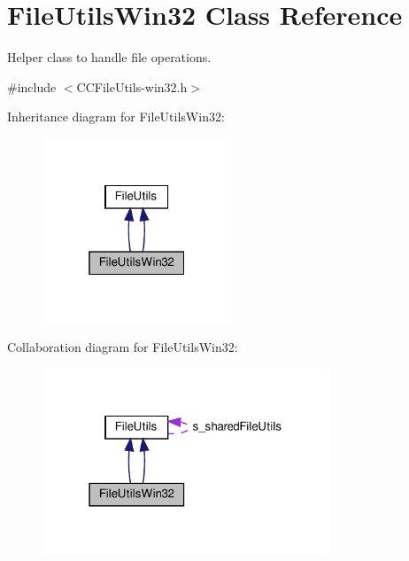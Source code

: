 \hypertarget{classFileUtilsWin32}{}\section{File\+Utils\+Win32 Class Reference}
\label{classFileUtilsWin32}


Helper class to handle file operations.  




{\ttfamily \#include $<$C\+C\+File\+Utils-\/win32.\+h$>$}



Inheritance diagram for File\+Utils\+Win32\+:
\nopagebreak
\begin{figure}[H]
\begin{center}
\leavevmode
\includegraphics[width=160pt]{classFileUtilsWin32__inherit__graph}
\end{center}
\end{figure}


Collaboration diagram for File\+Utils\+Win32\+:
\nopagebreak
\begin{figure}[H]
\begin{center}
\leavevmode
\includegraphics[width=244pt]{classFileUtilsWin32__coll__graph}
\end{center}
\end{figure}
